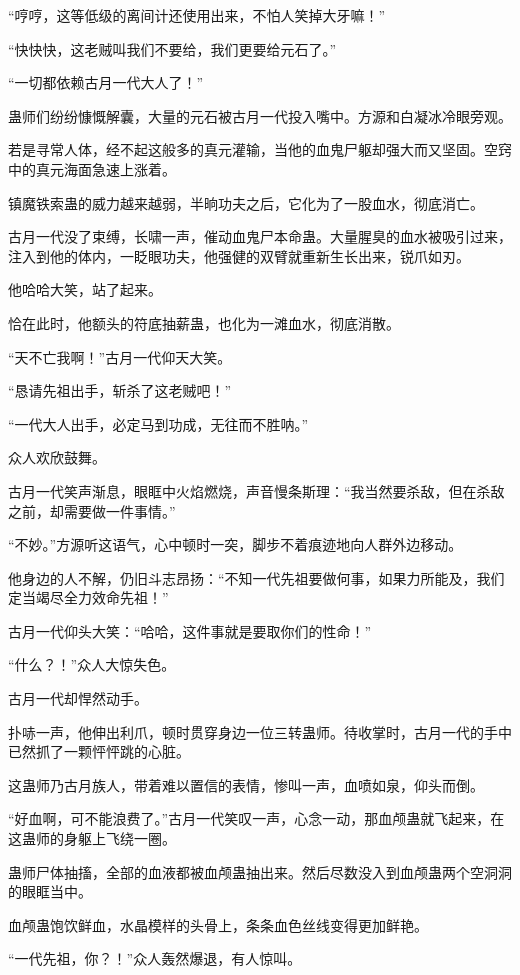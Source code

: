 \begin{this_body}
“哼哼，这等低级的离间计还使用出来，不怕人笑掉大牙嘛！”

“快快快，这老贼叫我们不要给，我们更要给元石了。”

“一切都依赖古月一代大人了！”

蛊师们纷纷慷慨解囊，大量的元石被古月一代投入嘴中。方源和白凝冰冷眼旁观。

若是寻常人体，经不起这般多的真元灌输，当他的血鬼尸躯却强大而又坚固。空窍中的真元海面急速上涨着。

镇魔铁索蛊的威力越来越弱，半晌功夫之后，它化为了一股血水，彻底消亡。

古月一代没了束缚，长啸一声，催动血鬼尸本命蛊。大量腥臭的血水被吸引过来，注入到他的体内，一眨眼功夫，他强健的双臂就重新生长出来，锐爪如刃。

他哈哈大笑，站了起来。

恰在此时，他额头的符底抽薪蛊，也化为一滩血水，彻底消散。

“天不亡我啊！”古月一代仰天大笑。

“恳请先祖出手，斩杀了这老贼吧！”

“一代大人出手，必定马到功成，无往而不胜呐。”

众人欢欣鼓舞。

古月一代笑声渐息，眼眶中火焰燃烧，声音慢条斯理：“我当然要杀敌，但在杀敌之前，却需要做一件事情。”

“不妙。”方源听这语气，心中顿时一突，脚步不着痕迹地向人群外边移动。

他身边的人不解，仍旧斗志昂扬：“不知一代先祖要做何事，如果力所能及，我们定当竭尽全力效命先祖！”

古月一代仰头大笑：“哈哈，这件事就是要取你们的性命！”

“什么？！”众人大惊失色。

古月一代却悍然动手。

扑哧一声，他伸出利爪，顿时贯穿身边一位三转蛊师。待收掌时，古月一代的手中已然抓了一颗怦怦跳的心脏。

这蛊师乃古月族人，带着难以置信的表情，惨叫一声，血喷如泉，仰头而倒。

“好血啊，可不能浪费了。”古月一代笑叹一声，心念一动，那血颅蛊就飞起来，在这蛊师的身躯上飞绕一圈。

蛊师尸体抽搐，全部的血液都被血颅蛊抽出来。然后尽数没入到血颅蛊两个空洞洞的眼眶当中。

血颅蛊饱饮鲜血，水晶模样的头骨上，条条血色丝线变得更加鲜艳。

“一代先祖，你？！”众人轰然爆退，有人惊叫。


\end{this_body}

